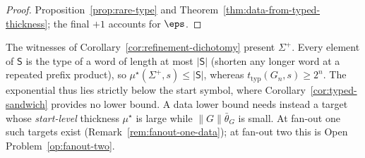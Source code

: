 \begin{proof}
Proposition~\ref{prop:rare-type} and
Theorem~\ref{thm:data-from-typed-thickness}; the final $+1$ accounts for
$\eps$.
\end{proof}



\begin{remark}
\label{rem:refinement-vs-data}
The witnesses of Corollary~\ref{cor:refinement-dichotomy} present
$\Sigma^+$.  Every element of $\mathsf S$ is the type of a word of length
at most $|\mathsf S|$ (shorten any longer word at a repeated prefix
product), so $\mu^\star(\Sigma^+,s)\le|\mathsf S|$, whereas
$t_{\mathrm{typ}}(G_n,s)\ge2^n$.  The exponential thus lies strictly
below the start symbol, where
Corollary~\ref{cor:typed-sandwich} provides no lower bound.  A
data lower bound needs instead a target whose \emph{start-level}
thickness $\mu^\star$ is large while $\|G\|\bar\theta_G$ is small.  At
fan-out one such targets exist (Remark~\ref{rem:fanout-one-data});
at fan-out two this is Open Problem~\ref{op:fanout-two}.
\end{remark}



